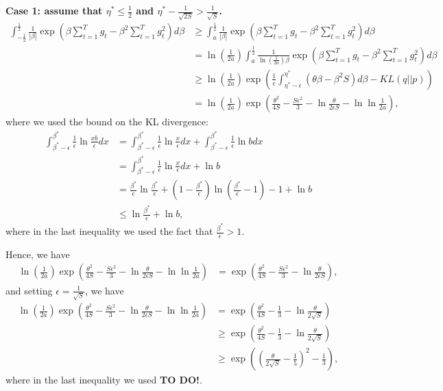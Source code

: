 \documentclass{colt2016_empty} %
\begin{document}
\textbf{Case 1: assume that $\eta^*\leq \frac{1}{2}$ and $\eta^*-\frac{1}{\sqrt{2S}}>\frac{1}{\sqrt{S}}$.}
\begin{align*}
\int_{-\frac{1}{2}}^{\frac{1}{2}} \frac{1}{|\beta|} \exp\left(\beta \sum_{t=1}^T g_t - \beta^2 \sum_{t=1}^T g_t^2 \right) d \beta 
&\geq \int_{a}^{\frac{1}{2}} \frac{1}{|\beta|} \exp\left(\beta \sum_{t=1}^T g_t - \beta^2 \sum_{t=1}^T g_t^2 \right) d \beta \\
&= \ln(\frac{1}{2a}) \int_{a}^{\frac{1}{2}} \frac{1}{ \ln(\frac{1}{2a}) \beta} \exp\left(\beta \sum_{t=1}^T g_t - \beta^2 \sum_{t=1}^T g_t^2 \right) d \beta \\
&\geq \ln(\frac{1}{2a}) \exp\left(\frac{1}{\epsilon}\int_{\eta^*-\epsilon}^{\eta^*} (\theta \beta - \beta^2 S) d \beta - KL(q||p)\right) \\
&= \ln(\frac{1}{2a}) \exp\left(\frac{\theta^2}{4 S} - \frac{S \epsilon^2}{3} - \ln\frac{\theta}{2\epsilon S}- \ln \ln \frac{1}{2 a}\right),
\end{align*}
where we used the bound on the KL divergence:
\begin{align*}
\int_{\beta^*-\epsilon}^{\beta^*} \frac{1}{\epsilon} \ln \frac{x b}{\epsilon} d x 
&= \int_{\beta^*-\epsilon}^{\beta^*} \frac{1}{\epsilon} \ln \frac{x}{\epsilon} d x
+ \int_{\beta^*-\epsilon}^{\beta^*} \frac{1}{\epsilon} \ln b d x \\
&= \int_{\beta^*-\epsilon}^{\beta^*} \frac{1}{\epsilon} \ln \frac{x}{\epsilon} d x
+ \ln b\\
&= \frac{\beta^*}{\epsilon} \ln \frac{\beta^*}{\epsilon} + \left(1-\frac{\beta^*}{\epsilon}\right) \ln \left(\frac{\beta^*}{\epsilon}-1\right)-1 + \ln b \\
&\leq \ln \frac{\beta^*}{\epsilon} + \ln b,
\end{align*}
where in the last inequality we used the fact that $\tfrac{\beta^*}{\epsilon}>1$.

Hence, we have
\begin{align*}
\ln(\frac{1}{2a}) \exp\left(\frac{\theta^2}{4 S} - \frac{S \epsilon^2}{3} - \ln\frac{\theta}{2\epsilon S}- \ln \ln \frac{1}{2 a}\right)
&=\exp\left(\frac{\theta^2}{4 S} - \frac{S \epsilon^2}{3} - \ln\frac{\theta}{2\epsilon S}\right),
\end{align*}
and setting $\epsilon=\frac{1}{\sqrt{S}}$, we have
\begin{align*}
\ln(\frac{1}{2a}) \exp\left(\frac{\theta^2}{4 S} - \frac{S \epsilon^2}{3} - \ln\frac{\theta}{2\epsilon S}- \ln \ln \frac{1}{2 a}\right)
&=\exp\left(\frac{\theta^2}{4 S} - \frac{1}{3} - \ln\frac{\theta}{2 \sqrt{S}}\right) \\
&\geq \exp\left(\frac{\theta^2}{4 S} - \frac{1}{3} - \ln\frac{\theta}{2 \sqrt{S}}\right) \\
&\geq \exp\left(\left(\frac{\theta}{2 \sqrt{S}} - \frac{1}{5}\right)^2 - \frac{1}{3}\right),
\end{align*}
where in the last inequality we used \textbf{TO DO!}.
\end{document}
